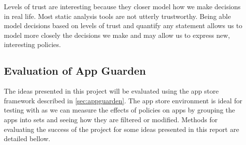 \documentclass[a4paper,sfsidenotes]{%
  scrartcl%
}
\begin{document}
Levels of trust are interesting because they closer model how we make decisions
in real life.  Most static analysis tools are not utterly trustworthy. Being
able model decisions based on levels of trust and quantify any statement allows
us to model more closely the decisions we make and may allow us to express new,
interesting policies.


\subsection{Evaluation of App Guarden}

The ideas presented in this project will be evaluated using the app store
framework described in \autoref{sec:appguarden}.  The app store environment is
ideal for testing with as we can measure the effects of policies on apps by
grouping the apps into sets and seeing how they are filtered or modified.  
Methods for evaluating the success of the project for some ideas
presented in this report are detailed bellow.
\end{document}
